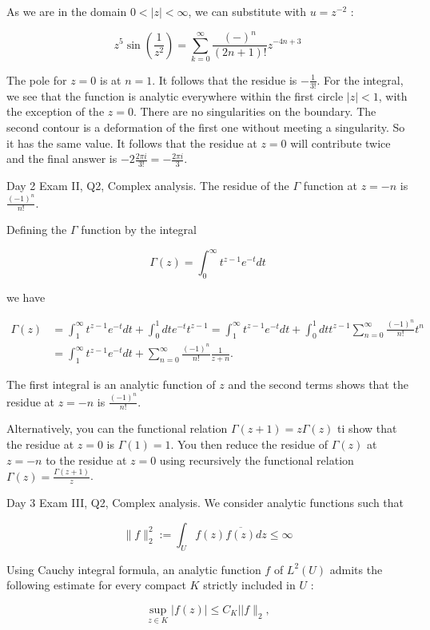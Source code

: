 \documentclass[10pt]{article}
\begin{document}
As we are in the domain $0<|z|<\infty$, we can substitute with $u=z^{-2}$ :

$$
z^{5} \sin \left(\frac{1}{z^{2}}\right)=\sum_{k=0}^{\infty} \frac{(-)^{n}}{(2 n+1) !} z^{-4 n+3}
$$

The pole for $z=0$ is at $n=1$. It follows that the residue is $-\frac{1}{3 !}$. For the integral, we see that the function is analytic everywhere within the first circle $|z|<1$, with the exception of the $z=0$. There are no singularities on the boundary. The second contour is a deformation of the first one without meeting a singularity. So it has the same value. It follows that the residue at $z=0$ will contribute twice and the final answer is $-2 \frac{2 \pi i}{3 !}=-\frac{2 \pi i}{3}$.

Day 2 Exam II, Q2, Complex analysis. The residue of the $\Gamma$ function at $z=-n$ is $\frac{(-1)^{n}}{n !}$.

Defining the $\Gamma$ function by the integral

$$
\Gamma(z)=\int_{0}^{\infty} t^{z-1} e^{-t} d t
$$

we have

$$
\begin{aligned}
\Gamma(z) & =\int_{1}^{\infty} t^{z-1} e^{-t} d t+\int_{0}^{1} d t e^{-t} t^{z-1}=\int_{1}^{\infty} t^{z-1} e^{-t} d t+\int_{0}^{1} d t t^{z-1} \sum_{n=0}^{\infty} \frac{(-1)^{n}}{n !} t^{n} \\
& =\int_{1}^{\infty} t^{z-1} e^{-t} d t+\sum_{n=0}^{\infty} \frac{(-1)^{n}}{n !} \frac{1}{z+n} .
\end{aligned}
$$

The first integral is an analytic function of $z$ and the second terms shows that the residue at $z=-n$ is $\frac{(-1)^{n}}{n !}$.

Alternatively, you can the functional relation $\Gamma(z+1)=z \Gamma(z)$ ti show that the residue at $z=0$ is $\Gamma(1)=1$. You then reduce the residue of $\Gamma(z)$ at $z=-n$ to the residue at $z=0$ using recursively the functional relation $\Gamma(z)=\frac{\Gamma(z+1)}{z}$.

Day 3 Exam III, Q2, Complex analysis. We consider analytic functions such that

$$
\|f\|_{2}^{2}:=\int_{U} f(z) \overline{f(z)} d z \leq \infty
$$

Using Cauchy integral formula, an analytic function $f$ of $L^{2}(U)$ admits the following estimate for every compact $K$ strictly included in $U$ :

$$
\sup _{z \in K}|f(z)| \leq C_{K}|| f \|_{2},
$$
\end{document}
